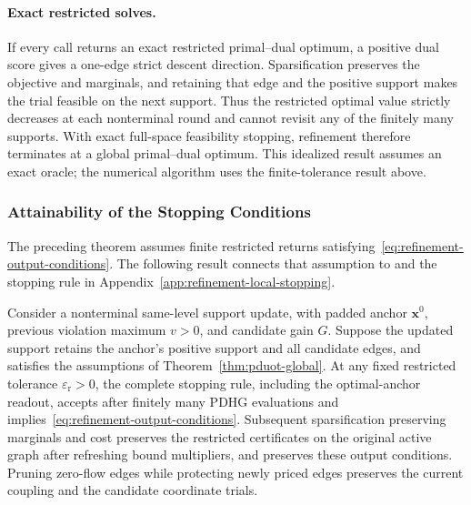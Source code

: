 \paragraph{Exact restricted solves.}
If every call returns an exact restricted primal--dual optimum, a positive dual score gives a one-edge strict descent direction.
Sparsification preserves the objective and marginals, and retaining that edge and the positive support makes the trial feasible on the next support.
Thus the restricted optimal value strictly decreases at each nonterminal round and cannot revisit any of the finitely many supports.
With exact full-space feasibility stopping, refinement therefore terminates at a global primal--dual optimum.
This idealized result assumes an exact oracle; the numerical algorithm uses the finite-tolerance result above.

\subsubsection{Attainability of the Stopping Conditions}
\label{app:refinement-stop-attainability}

The preceding theorem assumes finite restricted returns satisfying~\eqref{eq:refinement-output-conditions}.
The following result connects that assumption to \subsolver and the stopping rule in Appendix~\ref{app:refinement-local-stopping}.

\begin{proposition}
\label{prop:refinement-stop-attainability}
Consider a nonterminal same-level support update, with padded anchor $\mathbf x^0$, previous violation maximum $v>0$, and candidate gain $G$.
Suppose the updated support retains the anchor's positive support and all candidate edges, and \subsolver satisfies the assumptions of Theorem~\ref{thm:pduot-global}.
At any fixed restricted tolerance $\varepsilon_{\mathrm r}>0$, the complete stopping rule, including the optimal-anchor readout, accepts after finitely many PDHG evaluations and implies~\eqref{eq:refinement-output-conditions}.
Subsequent sparsification preserving marginals and cost preserves the restricted certificates on the original active graph after refreshing bound multipliers, and preserves these output conditions.
Pruning zero-flow edges while protecting newly priced edges preserves the current coupling and the candidate coordinate trials.
\end{proposition}

